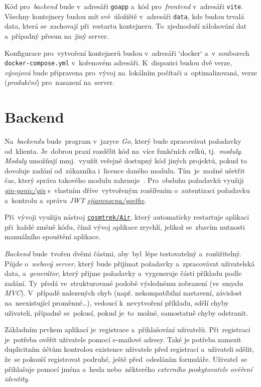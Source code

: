 \documentclass[11pt,a4paper]{report}
\begin{document}
        Kód pro~\emph{backend} bude v~adresáři \texttt{goapp} a~kód pro~\emph{frontend} v~adresáři \texttt{vite}. Všechny kontejnery budou mít své~úložiště v~adresáři \texttt{data}, kde budou trvalá data, která se~zachovají při~restartu kontejneru. To~zjednoduší zálohování dat a~případný přesun na~jiný server.

        Konfigurace pro~vytvoření kontejnerů budou v~adresáři `docker` a~v~souborech \texttt{docker-compose.yml} v~kořenovém adresáři. K~dispozici budou dvě verze, \emph{vývojová} bude připravena pro~vývoj na~lokálním počítači a~optimalizovaná, verze (\emph{produkční}) pro~nasazení na~server.
        
        \section{Backend}
            Na~\emph{backendu} bude~program v~jazyce \emph{Go}, který bude zpracovávat požadavky od~klienta. Je~dobrou praxí rozdělit kód na~více funkčních celků, tj.~\emph{moduly}. \emph{Moduly} umožňují mmj.~využít veřejně dostupný kód jiných projektů, pokud to dovoluje zadání od~zákazníka i~licence daného modulu. Tím~je~možné ušetřit čas, který správa takového modulu zahrnuje~\cite{Zimmerman2023:howtowritebetter}.
            Pro~obsluhu požadavků využiji \href{https://github.com/gin-gonic/gin}{\emph{gin-gonic/gin}} s~vlastním dříve~vytvořeným rozšířením o~autentizaci požadavku a~kontrolu a~správu \emph{JWT} \href{https://gitlab.com/sjiamnocna/goethe}{\emph{sjiamnocna/goethe}}.

            Při~vývoji využiju nástroj \href{https://github.com/cosmtrek/air}{\texttt{cosmtrek/Air}}, který automaticky restartuje aplikaci při~každé změně kódu, čímž vývoj aplikace zrychlí, jelikož se~zbavím nutnosti manuálního spouštění aplikace.

            \emph{Backend} bude~tvořen dvěmi částmi, aby~byl~lépe testovatelný a~rozšiřitelný. Půjde o~\emph{webový server}, který bude přijímat požadavky a~zpracovávat uživatelská data, a~\emph{generátor}, který přijme požadavky a~vygeneruje části příkladu podle zadání. Ty~předá ve~strukturované podobě výslednému zobrazení (ve~smyslu \emph{MVC}). V~případě nalezených chyb (např. nekompatibilní nastavení, závislost na~neexistující proměnné\dots), vedoucí k~nevytvoření příkladu, sdělí chyby uživateli, případně se~pokusí, pokud je~to~možné, samostatně chyby odstranit.

            Základním prvkem aplikací je~registrace a~přihlašování uživatelů. Při~registraci je~potřeba ověřit uživatele pomocí e-mailové adresy. Také je potřeba zamezit duplicitním účtům kontrolou existence uživatele před registrací a~uživateli sdělit, že~se pokouší registrovat podruhé, ještě před~odesláním formuláře. Uživatel~se přihlašuje pomocí jména a~hesla nebo~některého \emph{externího poskytovatele ověření identity}.
            
\end{document}
